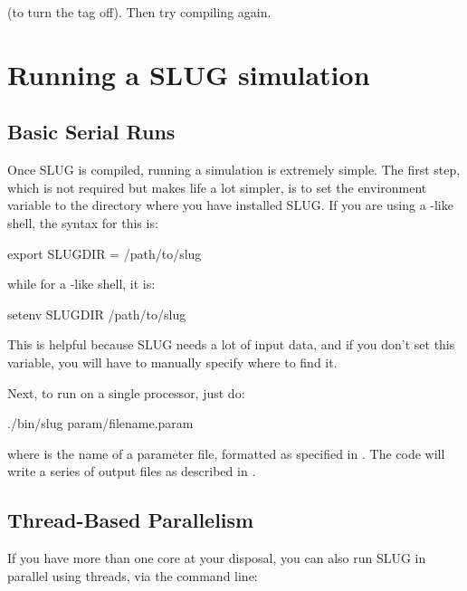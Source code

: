\documentclass[letterpaper,10pt,english]{sphinxmanual}
\begin{document}
(to turn the  tag off). Then try compiling again.


\chapter{Running a SLUG simulation}
\label{\detokenize{running:running-a-slug-simulation}}\label{\detokenize{running::doc}}

\section{Basic Serial Runs}
\label{\detokenize{running:basic-serial-runs}}
Once SLUG is compiled, running a simulation is extremely simple. The first step, which is not required but makes life a lot simpler, is to set the environment variable  to the directory where you have installed SLUG. If you are using a -like shell, the syntax for this is:

\begin{sphinxVerbatim}[commandchars=\\\{\}]
export SLUG\PYGZus{}DIR = /path/to/slug
\end{sphinxVerbatim}

while for a -like shell, it is:

\begin{sphinxVerbatim}[commandchars=\\\{\}]
setenv SLUG\PYGZus{}DIR /path/to/slug
\end{sphinxVerbatim}

This is helpful because SLUG needs a lot of input data, and if you don’t set this variable, you will have to manually specify where to find it.

Next, to run on a single processor, just do:

\begin{sphinxVerbatim}[commandchars=\\\{\}]
./bin/slug param/filename.param
\end{sphinxVerbatim}

where  is the name of a parameter file, formatted as specified in {\hyperref[\detokenize{parameters:sec-parameters}]{}}. The code will write a series of output files as described in {\hyperref[\detokenize{output:sec-output}]{}}.


\section{Thread-Based Parallelism}
\label{\detokenize{running:thread-based-parallelism}}
If you have more than one core at your disposal, you can also run SLUG in parallel using threads, via the command line:
\end{document}
